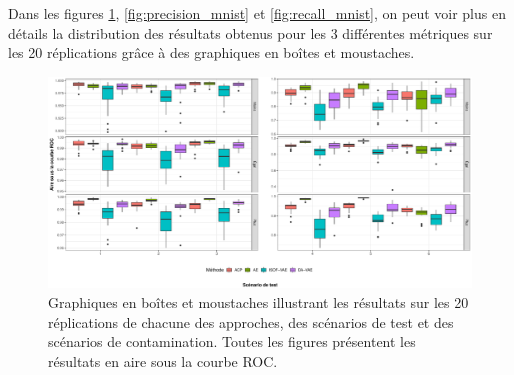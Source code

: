 Dans les figures \ref{fig:auc_mnist}, \ref{fig:precision_mnist} et \ref{fig:recall_mnist}, on peut voir plus en détails la distribution des résultats obtenus pour les 3 différentes métriques sur les 20 réplications grâce à des graphiques en boîtes et moustaches.

\begin{figure}[H]
	\centering
	\includegraphics[width=\linewidth]{images/images_boxplots/auc_mnist.pdf}
	\caption{Graphiques en boîtes et moustaches illustrant les résultats sur les 20 réplications de chacune des approches, des scénarios de test et des scénarios de contamination. Toutes les figures présentent les résultats en aire sous la courbe ROC.}
	\label{fig:auc_mnist}
\end{figure}

